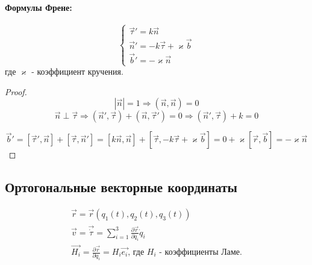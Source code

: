 \documentclass{article}
\begin{document}
  \paragraph{Формулы Френе:}
  $$ 
  \begin{cases}
  \overrightarrow{\tau}' = k \overrightarrow{n} \\
  \overrightarrow{n}' = - k\overrightarrow{\tau} + \varkappa \overrightarrow{b} \\
  \overrightarrow{b}' = -\varkappa\overrightarrow{n}
  \end{cases}
  $$
  где $\varkappa$ - коэффициент кручения.
  
  \begin{proof}
  $$ | \overrightarrow{n} | = 1 \Rightarrow (\overrightarrow{n}, \overrightarrow{n}) = 0 $$
  $$ \overrightarrow{n} \perp \overrightarrow{\tau} \Rightarrow (\overrightarrow{n}', \overrightarrow{\tau}) + (\overrightarrow{n}, \overrightarrow{\tau}') = 0 \Rightarrow (\overrightarrow{n}', \overrightarrow{\tau}) + k = 0 $$
  
  $$ \overrightarrow{b}' = [\overrightarrow{ \tau}', \overrightarrow{n}] + [\overrightarrow{\tau}, \overrightarrow{n}'] = [k\overrightarrow{n}, \overrightarrow{n}] + [\overrightarrow{\tau}, -k\overrightarrow{\tau} + \varkappa \overrightarrow{b}] = 0 + \varkappa[\overrightarrow{r}, \overrightarrow{b}] = -\varkappa\overrightarrow{n} $$
  \end{proof}
  \subsection*{Ортогональные векторные координаты}
  
  \begin{gather}
  \overrightarrow{r} = \overrightarrow{r}(q_1(t), q_2(t), q_3(t)) \\
  \overrightarrow{v} = \overrightarrow{\dot \tau}= \sum \limits_{i = 1}^3 \frac{\partial\overrightarrow{r}}{\partial q_i} \dot q_i\\
  \overrightarrow{H_i} = \frac{\partial\overrightarrow{r}}{\partial q_i} = H_i \overrightarrow{e_i} \text{, где $H_i$ - коэффициенты Ламе.} \\ 
  \end{gather}
\end{document}
